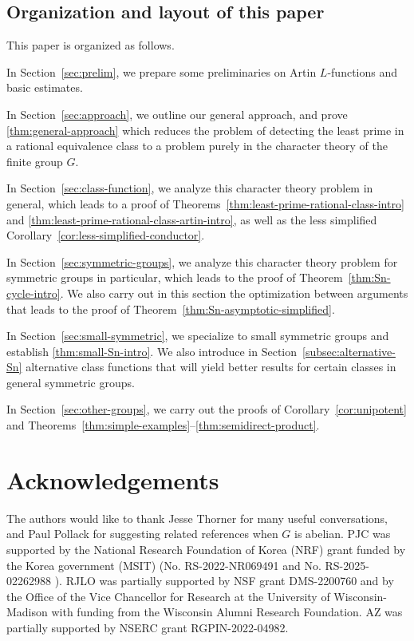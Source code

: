 \documentclass[12pt]{amsart}
\theoremstyle{definition} \newtheorem{definition}[theorem]{Definition}
\theoremstyle{example} \newtheorem{example}[theorem]{Example}
\theoremstyle{remark} \newtheorem{remark}{Remark}[theorem]
\numberwithin{equation}{section}
\numberwithin{theorem}{section}
\begin{document}
		

	
\subsection{Organization and layout of this paper}
	This paper is organized as follows.
	
	In Section~\ref{sec:prelim}, we prepare some preliminaries on Artin $L$-functions and basic estimates. 
	
	In Section~\ref{sec:approach}, we outline our general approach, and prove \cref{thm:general-approach} which reduces the problem of detecting the least prime in a rational equivalence class to a problem purely in the character theory of the finite group $G$.
	
	In Section~\ref{sec:class-function}, we analyze this character theory problem in general, which leads to a proof of Theorems~\ref{thm:least-prime-rational-class-intro} and \ref{thm:least-prime-rational-class-artin-intro}, as well as the less simplified Corollary~\ref{cor:less-simplified-conductor}.  
	
	In Section~\ref{sec:symmetric-groups}, we analyze this character theory problem for symmetric groups in particular, which leads to the proof of Theorem~\ref{thm:Sn-cycle-intro}.  We also carry out in this section the optimization between arguments that leads to the proof of Theorem~\ref{thm:Sn-asymptotic-simplified}.
	
	In Section~\ref{sec:small-symmetric}, we specialize to small symmetric groups and establish \cref{thm:small-Sn-intro}.  We also introduce in Section~\ref{subsec:alternative-Sn} alternative class functions that will yield better results for certain classes in general symmetric groups.
	
	In Section~\ref{sec:other-groups}, we carry out the proofs of Corollary~\ref{cor:unipotent} and Theorems~\ref{thm:simple-examples}--\ref{thm:semidirect-product}.


\section*{Acknowledgements}
The authors would like to thank Jesse Thorner for many useful conversations, and Paul Pollack for suggesting related references when $G$ is abelian. 
PJC was supported by the National Research Foundation of Korea (NRF) grant funded by the Korea government (MSIT) (No. RS-2022-NR069491 and No. RS-2025-02262988 ).  RJLO was partially supported by NSF grant DMS-2200760 and by the Office of the Vice Chancellor for Research at the University of Wisconsin-Madison with funding from the Wisconsin Alumni Research Foundation.  AZ was partially supported by NSERC grant RGPIN-2022-04982.  
\end{document}
